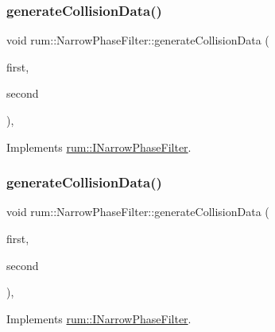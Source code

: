 \subsubsection{\texorpdfstring{generate\+Collision\+Data()}{generateCollisionData()}\hspace{0.1cm}{\footnotesize\ttfamily [3/5]}}
{\footnotesize\ttfamily void rum\+::\+Narrow\+Phase\+Filter\+::generate\+Collision\+Data (\begin{DoxyParamCaption}\item[{\mbox{\hyperlink{classrum_1_1_collision_box}{Collision\+Box}} $\ast$}]{first,  }\item[{\mbox{\hyperlink{classrum_1_1_collision_box}{Collision\+Box}} $\ast$}]{second }\end{DoxyParamCaption})\hspace{0.3cm}{\ttfamily [override]}, {\ttfamily [virtual]}}



Implements \mbox{\hyperlink{classrum_1_1_i_narrow_phase_filter_ade1c61b0bd136086ff27ca34953508c1}{rum\+::\+I\+Narrow\+Phase\+Filter}}.

\mbox{\label{classrum_1_1_narrow_phase_filter_abc6c56571ea9110801cac4b57960b8b3}} 
\subsubsection{\texorpdfstring{generate\+Collision\+Data()}{generateCollisionData()}\hspace{0.1cm}{\footnotesize\ttfamily [4/5]}}
{\footnotesize\ttfamily void rum\+::\+Narrow\+Phase\+Filter\+::generate\+Collision\+Data (\begin{DoxyParamCaption}\item[{\mbox{\hyperlink{classrum_1_1_collision_box}{Collision\+Box}} $\ast$}]{first,  }\item[{\mbox{\hyperlink{classrum_1_1_collision_sphere}{Collision\+Sphere}} $\ast$}]{second }\end{DoxyParamCaption})\hspace{0.3cm}{\ttfamily [override]}, {\ttfamily [virtual]}}



Implements \mbox{\hyperlink{classrum_1_1_i_narrow_phase_filter_a0f09a3143208893aa12fc9d86c7006e7}{rum\+::\+I\+Narrow\+Phase\+Filter}}.

